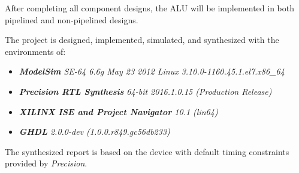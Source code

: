 After completing all component designs, the ALU will be implemented in both pipelined and non-pipelined designs.

\noindent The project is designed, implemented, simulated, and synthesized with the environments of:
\begin{itemize}
	\item \textit{\textbf{ModelSim} SE-64 6.6g May 23 2012 Linux 3.10.0-1160.45.1.el7.x86\_64}
	\item \textit{\textbf{Precision RTL Synthesis}  64-bit 2016.1.0.15 (Production Release)}
	\item \textit{\textbf{XILINX ISE and Project Navigator}  10.1 (lin64)}
	\item \textit{\textbf{GHDL} 2.0.0-dev (1.0.0.r849.gc56db233)}
\end{itemize}

\noindent The synthesized report is based on the  device with default timing constraints provided by \textit{Precision}.
